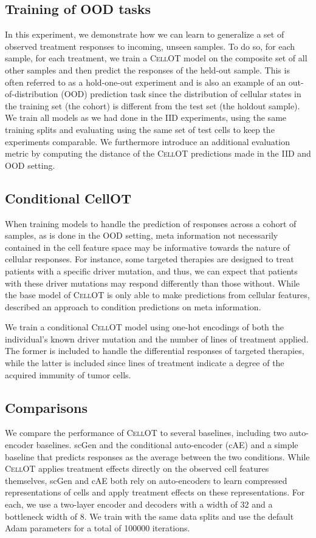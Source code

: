 \subsection{Training of OOD tasks}
In this experiment, we demonstrate how we can learn to generalize a set of observed treatment responses to incoming, unseen samples. To do so,  for each sample, for each treatment, we train a \textsc{CellOT} model on the composite set of all other samples and then predict the responses of the held-out sample. This is often referred to as a hold-one-out experiment and is also an example of an out-of-distribution (OOD) prediction task since the distribution of cellular states in the training set (the cohort) is different from the test set (the holdout sample). We train all models as we had done in the IID experiments, using the same training splits and evaluating using the same set of test cells to keep the experiments comparable. We furthermore introduce an additional evaluation metric by computing the distance of the \textsc{CellOT} predictions made in the IID and OOD setting.

\subsection{Conditional CellOT}
When training models to handle the prediction of responses across a cohort of samples, as is done in the OOD setting, meta information not necessarily contained in the cell feature space may be informative towards the nature of cellular responses. For instance, some targeted therapies are designed to treat patients with a specific driver mutation, and thus, we can expect that patients with these driver mutations may respond differently than those without. While the base model of \textsc{CellOT} is only able to make predictions from cellular features, \cite{bunne2022} described an approach to condition predictions on meta information.

We train a conditional \textsc{CellOT} model using one-hot encodings of both the individual’s known driver mutation and the number of lines of treatment applied. The former is included to handle the differential responses of targeted therapies, while the latter is included since lines of treatment indicate a degree of the acquired immunity of tumor cells.

\subsection{Comparisons}
We compare the performance of \textsc{CellOT} to several baselines, including two auto-encoder baselines. scGen \cite{lotfollahi2019} and the conditional auto-encoder (cAE) \cite{lopez2018} and a simple baseline that predicts responses as the average between the two conditions. While \textsc{CellOT} applies treatment effects directly on the observed cell features themselves, scGen and cAE both rely on auto-encoders to learn compressed representations of cells and apply treatment effects on these representations. For each, we use a two-layer encoder and decoders with a width of 32 and a bottleneck width of 8. We train with the same data splits and use the default Adam parameters for a total of 100000 iterations.
